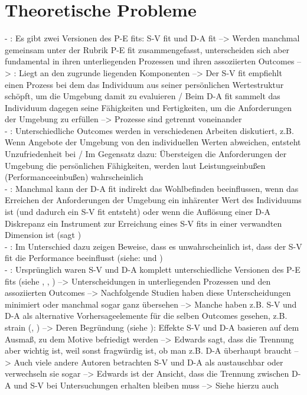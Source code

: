 \section{Theoretische Probleme}
\label{ch:notizen:theoretischeProbleme}
- \cite[S. 3f.]{edwards:1990}: Es gibt zwei Versionen des P-E fits: S-V fit und D-A fit --> Werden manchmal gemeinsam unter der Rubrik P-E fit zusammengefasst, unterscheiden sich aber fundamental in ihren unterliegenden Prozessen und ihren assoziierten Outcomes --> \cite[S. 4]{edwards:1990}: Liegt an den zugrunde liegenden Komponenten --> Der S-V fit empfiehlt einen Prozess bei dem das Individuum aus seiner persönlichen Wertestruktur schöpft, um die Umgebung damit zu evaluieren / Beim D-A fit sammelt das Individuum dagegen seine Fähigkeiten und Fertigkeiten, um die Anforderungen der Umgebung zu erfüllen --> Prozesse sind getrennt voneinander \\
- \cite[S. 4]{edwards:1990}: Unterschiedliche Outcomes werden in verschiedenen Arbeiten diskutiert, z.B. Wenn Angebote der Umgebung von den individuellen Werten abweichen, entsteht Unzufriedenheit bei \textcite{locke:1969} / Im Gegensatz dazu: Übersteigen die Anforderungen der Umgebung die persönlichen Fähigkeiten, werden laut \textcite{theoryOfBehaviorInOrganizations:1980} Leistungseinbußen (Performanceeinbußen) wahrscheinlich \\
- \cite[S. 4]{edwards:1990}: Manchmal kann der D-A fit indirekt das Wohlbefinden beeinflussen, wenn das Erreichen der Anforderungen der Umgebung ein inhärenter Wert des Individuums ist (und dadurch ein S-V fit entsteht) oder wenn die Auflösung einer D-A Diskrepanz ein Instrument zur Erreichung eines S-V fits in einer verwandten Dimension ist (sagt \textcite{mechanismsOfJobStressAndStrain:1982}) \\
- \cite[S. 4]{edwards:1990}: Im Unterschied dazu zeigen Beweise, dass es unwahrscheinlich ist, dass der S-V fit die Performance beeinflusst (siehe: \textcite{greene:1972} und \textcite{schwabCummings:1970}) \\
- \cite[S. 4]{edwards:1990}: Ursprünglich waren S-V und D-A komplett unterschiedliche Versionen des P-E fits (siehe \textcite{copingAndAdaption:1974}, \textcite{mechanismsOfJobStressAndStrain:1982}, \textcite{harrison:1978}) --> Unterscheidungen in unterliegenden Prozessen und den assoziierten Outcomes --> Nachfolgende Studien haben diese Unterscheidungen minimiert oder manchmal sogar ganz übersehen --> Manche haben z.B. S-V und D-A als alternative Vorhersageelemente für die selben Outcomes gesehen, z.B. strain (\textcite{jobDemandsAndWorkerHealth:1975}, \textcite{mechanismsOfJobStressAndStrain:1982}) --> Deren Begründung (siehe \textcite[S. 31]{mechanismsOfJobStressAndStrain:1982}): Effekte S-V und D-A basieren auf dem Ausmaß, zu dem Motive befriedigt werden --> Edwards sagt, dass die Trennung aber wichtig ist, weil sonst fragwürdig ist, ob man z.B. D-A überhaupt braucht --> Auch viele andere Autoren betrachten S-V und D-A als austauschbar oder verwechseln sie sogar  --> Edwards ist der Ansicht, dass die Trennung zwischen D-A und S-V bei Untersuchungen erhalten bleiben muss --> Siehe hierzu auch \textcite{mechanismsOfJobStressAndStrain:1982} \\
